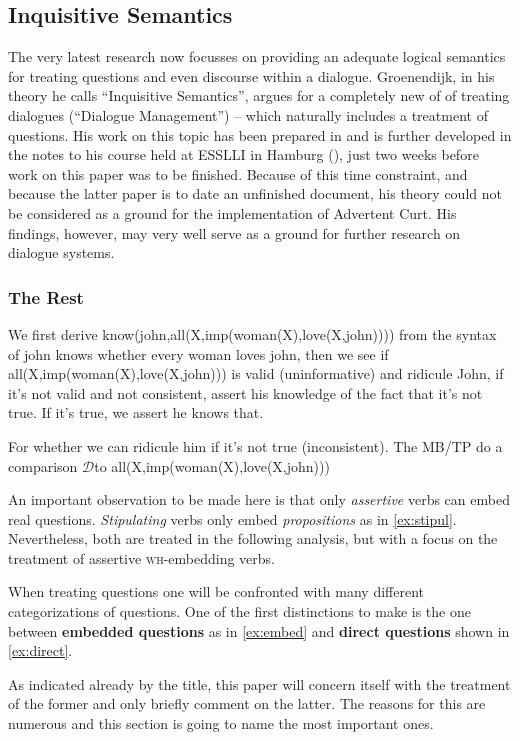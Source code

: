 \documentclass[a4paper]{article}
\newcommand{\term}[1]{\textsf{\textbf{#1}}} %
\newcommand{\pn}{\textsf} %
\newcommand{\Disc}{\ensuremath{\mathcal{D}}} %
\newcommand{\wh}{\textsc{wh}}
\newcommand{\acurt}{\pn{Advertent Curt}}
\theoremstyle{remark}
\theoremstyle{remark}
\theoremstyle{definition}
\theoremstyle{definition}
\begin{document}
\subsection{Inquisitive Semantics}\label{sec:altq}

The very latest research now focusses on providing an adequate logical semantics
for treating questions and even discourse within a dialogue. Groenendijk, in his
theory he calls ``Inquisitive Semantics'', argues for a completely new of of
treating dialogues (``Dialogue Management'') -- which naturally includes a
treatment of questions. His work on this topic has been prepared in \cite{g:is}
and is further developed in the notes to his course held at ESSLLI in Hamburg
(\cite{g:isdm}), just two weeks before work on this paper was to be finished.
Because of this time constraint, and because the latter paper is to date an
unfinished document, his theory could not be considered as a ground for the
implementation of \acurt. His findings, however, may very well serve as a ground
for further research on dialogue systems.

\subsubsection{The Rest}

We first derive know(john,all(X,imp(woman(X),love(X,john)))) from the syntax of
john knows whether every woman loves john, then we see if
all(X,imp(woman(X),love(X,john))) is valid (uninformative) and ridicule John, if
it's not valid and not consistent, assert his knowledge of the fact that it's
not true. If it's true, we assert he knows that.

For whether we can ridicule him if it's not true (inconsistent).
The MB/TP do a comparison \Disc to all(X,imp(woman(X),love(X,john)))

An important observation to be made here is that only \emph{assertive} verbs can
embed real questions. \emph{Stipulating} verbs only embed \emph{propositions} as
in \ref{ex:stipul}.
Nevertheless, both are treated in the following analysis, but with a focus on
the treatment of assertive \wh-embedding verbs.

When treating questions one will be confronted with many different
categorizations of questions. One of the first distinctions to make is the one
between \term{embedded questions} as in \ref{ex:embed} and \term{direct
questions} shown in \ref{ex:direct}.

As indicated already by the title, this paper will concern itself with the
treatment of the former and only briefly comment on the latter. The reasons for
this are numerous  %
and this section is going to name the most important ones.
\end{document}
